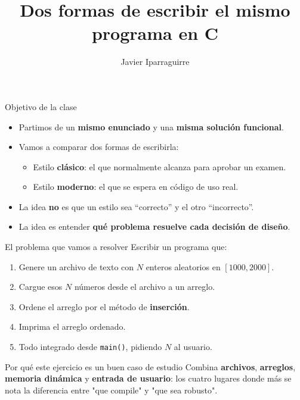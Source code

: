 \documentclass[aspectratio=169]{beamer}
\title{Dos formas de escribir el mismo programa en C}
\author[J. Iparraguirre] {Javier Iparraguirre}
\institute{
Universidad Tecnológica Nacional\\
11 de abril 461, Bahía Blanca, Argentina\\
\email\\
\url{http://www.frbb.utn.edu.ar/}}
\begin{document}
\begin{frame}
    \titlepage
\end{frame}

\begin{frame}{Objetivo de la clase}
    \begin{itemize}
        \item Partimos de un \textbf{mismo enunciado} y una \textbf{misma solución funcional}.
        \item Vamos a comparar dos formas de escribirla:
        \begin{itemize}
            \item[\textbf{(1)}] Estilo \textbf{clásico}: el que normalmente alcanza para aprobar un examen.
            \item[\textbf{(2)}] Estilo \textbf{moderno}: el que se espera en código de uso real.
        \end{itemize}
        \item La idea \textbf{no} es que un estilo sea ``correcto'' y el otro ``incorrecto''.
        \item La idea es entender \textbf{qué problema resuelve cada decisión de diseño}.
    \end{itemize}
\end{frame}

\begin{frame}{El problema que vamos a resolver}
    \small
    Escribir un programa que:
    \begin{enumerate}
        \item Genere un archivo de texto con $N$ enteros aleatorios en $[1000, 2000]$.
        \item Cargue esos $N$ números desde el archivo a un arreglo.
        \item Ordene el arreglo por el método de \textbf{inserción}.
        \item Imprima el arreglo ordenado.
        \item Todo integrado desde \texttt{main()}, pidiendo $N$ al usuario.
    \end{enumerate}

    \vspace{0.5em}
    \begin{block}{Por qué este ejercicio es un buen caso de estudio}
        Combina \textbf{archivos}, \textbf{arreglos}, \textbf{memoria dinámica} y
        \textbf{entrada de usuario}: los cuatro lugares donde más se nota la diferencia
        entre "que compile" y "que sea robusto".
    \end{block}
\end{frame}
\end{document}
